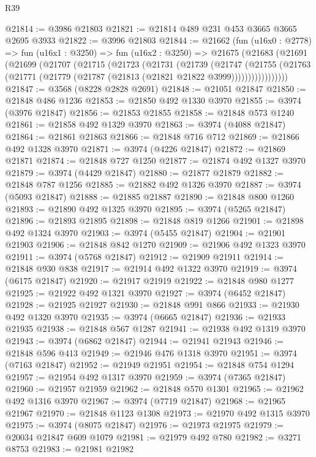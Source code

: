 \begin{lexlean}{R39}
\begin{coremodule}
@21814 := @3986 @21803
@21821 := @21814 @489 @231 @453 @3665 @3665 @2695 @3933
@21822 := @3996 @21803
@21844 := @21662
    (fun (u16x0 : @2778) =>
    fun (u16x1 : @3250) =>
    fun (u16x2 : @3250) =>
    @21675
      (@21683
        (@21691
          (@21699
            (@21707
              (@21715
                (@21723
                  (@21731
                    (@21739
                      (@21747
                        (@21755
                          (@21763
                            (@21771 (@21779 (@21787 (@21813 (@21821 @21822 @3999)))))))))))))))))
@21847 := @3568 (@8228 @2828 @2691)
@21848 := @21051 @21847
@21850 := @21848 @486 @1236
@21853 := @21850 @492 @1330 @3970
@21855 := @3974 (@3976 @21847)
@21856 := @21853 @21855
@21858 := @21848 @573 @1240
@21861 := @21858 @492 @1329 @3970
@21863 := @3974 (@4088 @21847)
@21864 := @21861 @21863
@21866 := @21848 @716 @712
@21869 := @21866 @492 @1328 @3970
@21871 := @3974 (@4226 @21847)
@21872 := @21869 @21871
@21874 := @21848 @727 @1250
@21877 := @21874 @492 @1327 @3970
@21879 := @3974 (@4429 @21847)
@21880 := @21877 @21879
@21882 := @21848 @787 @1256
@21885 := @21882 @492 @1326 @3970
@21887 := @3974 (@5093 @21847)
@21888 := @21885 @21887
@21890 := @21848 @800 @1260
@21893 := @21890 @492 @1325 @3970
@21895 := @3974 (@5265 @21847)
@21896 := @21893 @21895
@21898 := @21848 @819 @1266
@21901 := @21898 @492 @1324 @3970
@21903 := @3974 (@5455 @21847)
@21904 := @21901 @21903
@21906 := @21848 @842 @1270
@21909 := @21906 @492 @1323 @3970
@21911 := @3974 (@5768 @21847)
@21912 := @21909 @21911
@21914 := @21848 @930 @838
@21917 := @21914 @492 @1322 @3970
@21919 := @3974 (@6175 @21847)
@21920 := @21917 @21919
@21922 := @21848 @980 @1277
@21925 := @21922 @492 @1321 @3970
@21927 := @3974 (@6452 @21847)
@21928 := @21925 @21927
@21930 := @21848 @991 @866
@21933 := @21930 @492 @1320 @3970
@21935 := @3974 (@6665 @21847)
@21936 := @21933 @21935
@21938 := @21848 @567 @1287
@21941 := @21938 @492 @1319 @3970
@21943 := @3974 (@6862 @21847)
@21944 := @21941 @21943
@21946 := @21848 @596 @413
@21949 := @21946 @476 @1318 @3970
@21951 := @3974 (@7163 @21847)
@21952 := @21949 @21951
@21954 := @21848 @754 @1294
@21957 := @21954 @492 @1317 @3970
@21959 := @3974 (@7365 @21847)
@21960 := @21957 @21959
@21962 := @21848 @570 @1301
@21965 := @21962 @492 @1316 @3970
@21967 := @3974 (@7719 @21847)
@21968 := @21965 @21967
@21970 := @21848 @1123 @1308
@21973 := @21970 @492 @1315 @3970
@21975 := @3974 (@8075 @21847)
@21976 := @21973 @21975
@21979 := @20034 @21847 @609 @1079
@21981 := @21979 @492 @780
@21982 := @3271 @8753
@21983 := @21981 @21982

\end{coremodule}
\end{lexlean}
